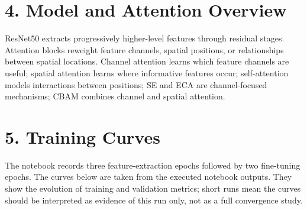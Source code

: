 \documentclass[10pt]{article}
\begin{document}
\section*{4. Model and Attention Overview}
ResNet50 extracts progressively higher-level features through residual stages. Attention blocks reweight feature channels, spatial positions, or relationships between spatial locations. Channel attention learns which feature channels are useful; spatial attention learns where informative features occur; self-attention models interactions between positions; SE and ECA are channel-focused mechanisms; CBAM combines channel and spatial attention.
\begin{center}
\end{center}

\section*{5. Training Curves}
The notebook records three feature-extraction epochs followed by two fine-tuning epochs. The curves below are taken from the executed notebook outputs. They show the evolution of training and validation metrics; short runs mean the curves should be interpreted as evidence of this run only, not as a full convergence study.
\end{document}
